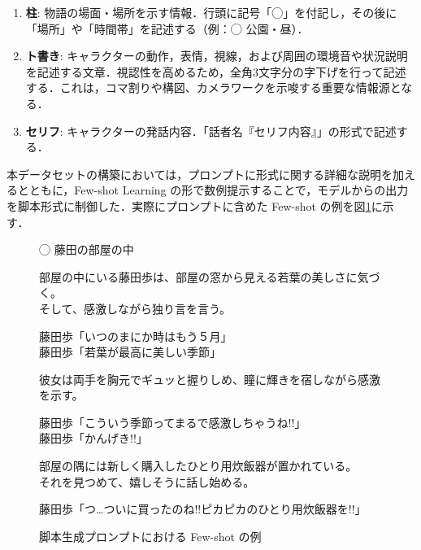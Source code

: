 \documentclass[a4j,12pt]{jsreport}
\begin{document}
\begin{enumerate}
   \item \textbf{柱}:
         物語の場面・場所を示す情報．行頭に記号「◯」を付記し，その後に「場所」や「時間帯」を記述する（例：◯ 公園・昼）．

   \item \textbf{ト書き}:
         キャラクターの動作，表情，視線，および周囲の環境音や状況説明を記述する文章．視認性を高めるため，全角3文字分の字下げを行って記述する．これは，コマ割りや構図、カメラワークを示唆する重要な情報源となる．

   \item \textbf{セリフ}:
         キャラクターの発話内容．「話者名『セリフ内容』」の形式で記述する．
\end{enumerate}

本データセットの構築においては，プロンプトに形式に関する詳細な説明を加えるとともに，Few-shot Learning の形で数例提示することで，モデルからの出力を脚本形式に制御した．実際にプロンプトに含めた Few-shot の例を図\ref{fig:prompt_example}に示す．

\begin{figure}[H]
   \centering
   \begin{minipage}{0.90\linewidth}
      \begin{itembox}[l]{}
         {\small\ttfamily
            ◯ 藤田の部屋の中

            \medskip
            \hspace{3zw}部屋の中にいる藤田歩は、部屋の窓から見える若葉の美しさに気づく。\\
            \hspace{3zw}そして、感激しながら独り言を言う。

            \medskip
            藤田歩「いつのまにか時はもう５月」\\
            藤田歩「若葉が最高に美しい季節」

            \medskip
            \hspace{3zw}彼女は両手を胸元でギュッと握りしめ、瞳に輝きを宿しながら感激を示す。

            \medskip
            藤田歩「こういう季節ってまるで感激しちゃうね!!」\\
            藤田歩「かんげき!!」

            \medskip
            \hspace{3zw}部屋の隅には新しく購入したひとり用炊飯器が置かれている。\\
            \hspace{3zw}それを見つめて、嬉しそうに話し始める。

            \medskip
            藤田歩「つ…ついに買ったのね!!ピカピカのひとり用炊飯器を!!」
         }
      \end{itembox}
   \end{minipage}
   \caption{脚本生成プロンプトにおける Few-shot の例}
   \label{fig:prompt_example}
\end{figure}
\end{document}
